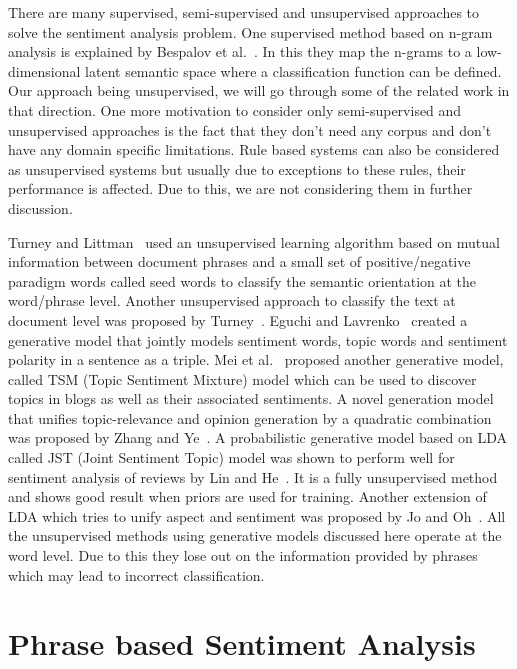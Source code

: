 \documentclass[11pt]{article}
\begin{document}
There are many supervised, semi-supervised and unsupervised approaches to solve the 
sentiment analysis problem. One supervised method based on n-gram analysis is explained by
Bespalov et al.~. In this they map the n-grams to a low-
dimensional latent semantic space where a classification function can be defined. Our approach 
being unsupervised, we will go through some of the related work in that direction. One more 
motivation to consider only semi-supervised and unsupervised approaches is the fact that they 
don't need any corpus and don't have any domain specific limitations. Rule based systems can 
also be considered as unsupervised systems but usually due to exceptions to these rules, their 
performance is affected. Due to this, we are not considering them in further discussion.

Turney and Littman~ used an unsupervised learning algorithm 
based on mutual information between document phrases and a small set of positive/negative 
paradigm words called seed words to classify the semantic orientation at the word/phrase 
level. Another unsupervised approach to classify the text at document level was proposed
by Turney~. Eguchi and Lavrenko~ 
created a generative model that jointly models sentiment words, topic words and sentiment
polarity in a sentence as a triple. Mei et al.~ proposed another 
generative model, called TSM (Topic Sentiment Mixture) model which can be used to discover 
topics in blogs as well as their associated sentiments. A novel generation model that 
unifies topic-relevance and opinion generation by a quadratic combination was proposed by 
Zhang and Ye~. A probabilistic generative model based on LDA
called JST (Joint Sentiment Topic) model was shown to perform well for sentiment analysis 
of reviews by Lin and He~. It is a fully unsupervised method
and shows good result when priors are used for training. Another extension of LDA which tries
to unify aspect and sentiment was proposed by Jo and Oh~. All the 
unsupervised methods using generative models discussed here operate at the word level. Due 
to this they lose out on the information provided by phrases which may lead to incorrect 
classification.

\section{Phrase based Sentiment Analysis}\label{process}
\end{document}
